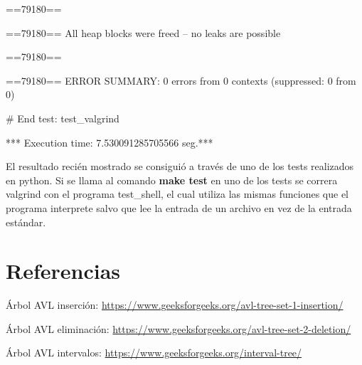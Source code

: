 \documentclass[a4paper, 12pt]{article}
\begin{document}
==79180== 

==79180== All heap blocks were freed -- no leaks are possible

==79180== 

==79180== ERROR SUMMARY: 0 errors from 0 contexts (suppressed: 0 from 0)

# End test: test\_valgrind

*** Execution time: 7.530091285705566 seg.***
\newline

	El resultado recién mostrado se consiguió a través de uno de los tests realizados en python. Si se llama al comando \textbf{make test} en uno de los tests se correra valgrind con el programa test\_shell, el cual utiliza las mismas funciones que el programa interprete salvo que lee la entrada de un archivo en vez de la entrada estándar.

\section{Referencias}

Árbol AVL inserción:
\url{https://www.geeksforgeeks.org/avl-tree-set-1-insertion/}

Árbol AVL eliminación:
\url{https://www.geeksforgeeks.org/avl-tree-set-2-deletion/}

Árbol AVL intervalos:
\url{https://www.geeksforgeeks.org/interval-tree/}
\end{document}
